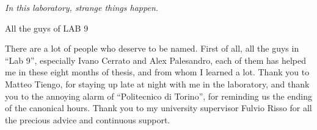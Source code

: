 \documentclass[12pt,classica, english]{toptesi}
\begin{document}

\frontmatter
\begin{comment}
\vspace*{\stretch{1}}
\begin{flushright}
\noindent
grazie a tutti
\end{flushright}
\vspace*{\stretch{6}}
\cleardoublepage
\end{comment}
\begin{flushright}
\noindent


\textit{In this laboratory, strange things happen.}

All the guys of LAB 9
\end{flushright}
\cleardoublepage

%

\setcounter{secnumdepth}{4}
\setcounter{tocdepth}{3}
\newcommand{\servecitazione}[1]{\textcolor{blue}{\textbf{citare qualcosa : #1}}}
\newcommand{\needsrevision}[1] {\textcolor{green}{\textbf{needs revision: #1}}}
\newcommand{\matteo}[1] {\textcolor{green}{\textbf{Matteo: #1}}}
\newcommand{\matteodubbio}[1] {\textcolor{red}{\textbf{questa Matteo non l'ha capita "#1"}}}
\newcommand{\fabiodubbio}[1] {\textcolor{red}{\textbf{Fabio non riesce a capire perche' ha scritto queste vaccate "#1"}}}
\newcommand{\imageneeded}[1] {\textcolor{blue}{\textbf{Image is needed "#1"}}}
\newcommand{\fabio}[1] {\textcolor{green}{\textbf{Fabio: #1}}}


\ringraziamenti
There are a lot of people who deserve to be named. First of all, all the guys in ``Lab 9'', especially Ivano Cerrato and Alex Palesandro, each of them has helped me in these eight months of thesis, and from whom I learned a lot. Thank you to Matteo Tiengo, for staying up late at night with me in the laboratory, and thank you to the annoying alarm of ``Politecnico di Torino'', for reminding us the ending of the canonical hours. Thank you to my university supervisor Fulvio Risso for all the precious advice and continuous support. 
\end{document}
